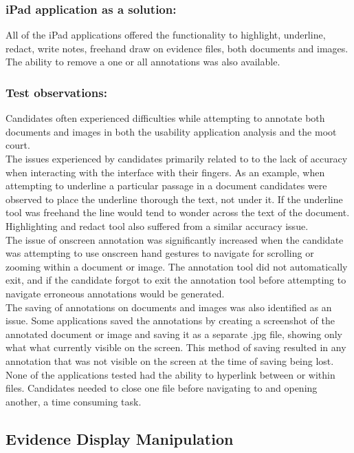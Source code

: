 \subsubsection{iPad application as a solution:}
All of the iPad applications offered the functionality to highlight, underline, redact, write notes, freehand draw on evidence files, both documents and images. The ability to remove a one or all annotations was also available.
\\
\subsubsection{Test observations:}
Candidates often experienced difficulties while attempting to annotate both documents and images in both the usability application analysis and the moot court.\\
The issues experienced by candidates primarily related to to the lack of accuracy when interacting with the interface with their fingers. As an example, when attempting to underline a particular passage in a document candidates were observed to place the underline thorough the text, not under it. If the underline tool was freehand the line would tend to wonder across the text of the document. Highlighting and redact tool also suffered from a similar accuracy issue.\\
The issue of onscreen annotation was significantly increased when the candidate was attempting to use onscreen hand gestures to navigate for scrolling or zooming within a document or image. The annotation tool did not automatically exit, and if the candidate forgot to exit the annotation tool before attempting to navigate erroneous annotations  would be generated.\\
The saving of annotations on documents and images was also identified as an issue. Some applications saved the annotations by creating a screenshot of the annotated document or image and saving it as a separate .jpg file, showing only what what currently visible on the screen. This method of saving resulted in any annotation that was not visible on the screen at the time of saving being lost.
None of the applications tested had the ability to hyperlink between or within files. Candidates needed to close one file before navigating to and opening another, a time consuming task.


\subsection{Evidence Display Manipulation}
